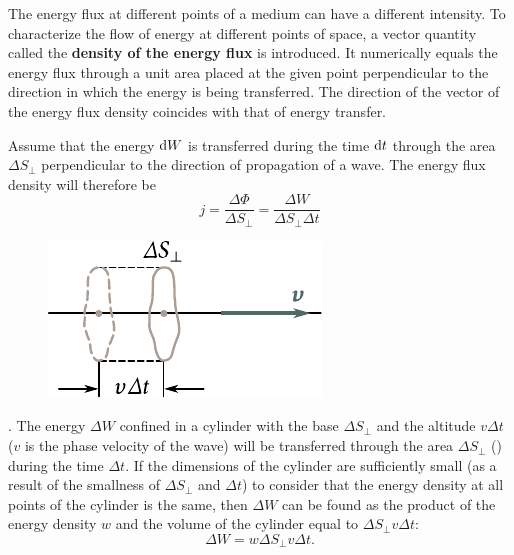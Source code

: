 The energy flux at different points of a medium can have a different intensity.
To characterize the flow of energy at different points of space, a vector quantity called the \textbf{density of the energy flux} is introduced.
It numerically equals the energy flux through a unit area placed at the given point perpendicular to the direction in which the energy is being transferred.
The direction of the vector of the energy flux density coincides with that of energy transfer.

Assume that the energy $\mathrm{d} W$ is transferred during the time $\mathrm{d} t$ through the area $\Delta{S}_{\perp}$ perpendicular to the direction of propagation of a wave.
The energy flux density will therefore be
\begin{equation}\label{eq:14_45}
	j = \frac{\Delta{\Phi}}{\Delta{S}_{\perp}} = \frac{\Delta{W}}{\Delta{S}_{\perp} \Delta{t}}
\end{equation}

\begin{figure}[t]
	\begin{center}
		\includegraphics[scale=1]{figures/ch_14/fig_14_8.pdf}
		\caption[]{}
		\label{fig:14_8}
	\end{center}
	\vspace{-0.9cm}
\end{figure}

.
The energy $\Delta{W}$ confined in a cylinder with the base $\Delta{S}_{\perp}$ and the altitude $v\Delta{t}$ ($v$ is the phase velocity of the wave) will be transferred through the area $\Delta{S}_{\perp}$ () during the time $\Delta{t}$.
If the dimensions of the cylinder are sufficiently small (as a result of the smallness of $\Delta{S}_{\perp}$ and $\Delta{t}$) to consider that the energy density at all points of the cylinder is the same, then $\Delta{W}$ can be found as the product of the energy density $w$ and the volume of the cylinder equal to $\Delta{S}_{\perp}v\Delta{t}$:
\begin{equation*}
	\Delta{W} = w \Delta{S}_{\perp} v \Delta{t}.
\end{equation*}

